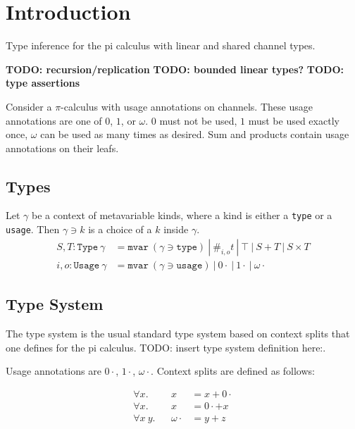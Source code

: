 \documentclass[sigplan,review,screen]{acmart}
\begin{document}
\hypertarget{introduction}{%
\section{Introduction}\label{introduction}}

Type inference for the pi calculus with linear and shared channel types.

\textbf{TODO: recursion/replication} \textbf{TODO: bounded linear
types?} \textbf{TODO: type assertions}

Consider a \(\pi\)-calculus with usage annotations on channels. These
usage annotations are one of \(0\), \(1\), or \(\omega\). \(0\) must not
be used, \(1\) must be used exactly once, \(\omega\) can be used as many
times as desired. Sum and products contain usage annotations on their
leafs.

\hypertarget{types}{%
\subsection{Types}\label{types}}

Let \(\gamma\) be a context of metavariable kinds, where a kind is
either a \texttt{type} or a \texttt{usage}. Then \(\gamma \ni k\) is a
choice of a \(k\) inside \(\gamma\). \[
\begin{aligned}
S, T : \texttt{Type}~\gamma &= \texttt{mvar}~(\gamma \ni \texttt{type}) ~|~ \#_{i,o}t ~|~ \top ~|~ S + T ~|~ S \times T \\
i,o : \texttt{Usage}~\gamma &= \texttt{mvar}~(\gamma \ni \texttt{usage}) ~|~ 0\cdot ~|~ 1\cdot ~|~ \omega\cdot
\end{aligned}
\]

\hypertarget{type-system}{%
\subsection{Type System}\label{type-system}}

The type system is the usual standard type system based on context
splits that one defines for the pi calculus. TODO: insert type system
definition here:.

Usage annotations are \(0\cdot\), \(1\cdot\), \(\omega\cdot\). Context
splits are defined as follows:

\[
\begin{aligned}
\forall x.    && x           &= x + 0\cdot \\
\forall x.    && x           &= 0\cdot + x \\
\forall x ~y. && \omega\cdot &= y + z
\end{aligned}
\]
\end{document}
